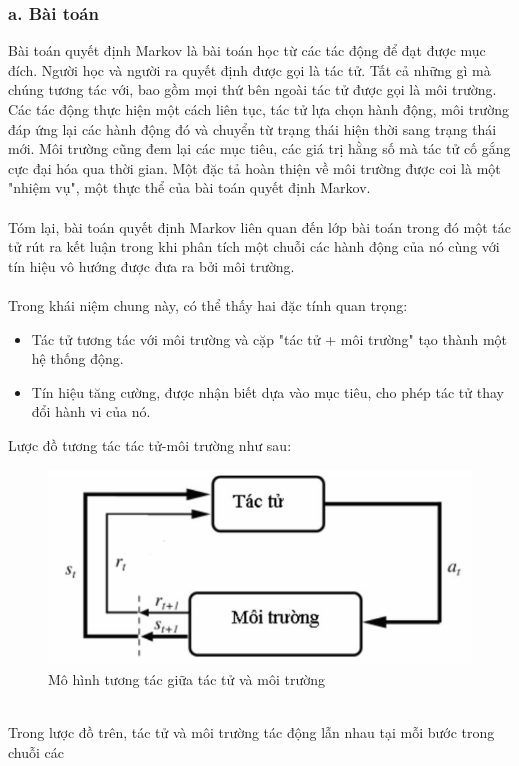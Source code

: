 \documentclass[12pt,a4paper]{report}
\begin{document}
\subsubsection{a. Bài toán}
Bài toán quyết định Markov là bài toán học từ các tác động để đạt được mục đích. Người
học và người ra quyết định được gọi là tác tử. Tất cả những gì mà chúng tương tác với, bao
gồm mọi thứ bên ngoài tác tử được gọi là môi trường. Các tác động thực hiện một cách liên
tục, tác tử lựa chọn hành động, môi trường đáp ứng lại các hành động đó và chuyển từ trạng
thái hiện thời sang trạng thái mới. Môi trường cũng đem lại các mục tiêu, các giá trị hằng số
mà tác tử cố gắng cực đại hóa qua thời gian. Một đặc tả hoàn thiện về môi trường được coi là
một "nhiệm vụ", một thực thể của bài toán quyết định Markov.\\\\
Tóm lại, bài toán quyết định Markov liên quan đến lớp bài toán trong đó một tác tử rút ra kết
luận trong khi phân tích một chuỗi các hành động của nó cùng với tín hiệu vô hướng được
đưa ra bởi môi trường.\\\\
Trong khái niệm chung này, có thể thấy hai đặc tính quan trọng:
\begin{itemize}
	\item Tác tử tương tác với môi trường và cặp "tác tử + môi trường" tạo thành một hệ thống
	động.
	\item Tín hiệu tăng cường, được nhận biết dựa vào mục tiêu, cho phép tác tử thay đổi hành
	vi của nó.
\end{itemize}
Lược đồ tương tác tác tử-môi trường như sau:
\begin{figure}[h]
	\centering
	\includegraphics[scale=.5]{2} 
	\caption{Mô hình tương tác giữa tác tử và môi trường}
\end{figure}\\
Trong lược đồ trên, tác tử và môi trường tác động lẫn nhau tại mỗi bước trong chuỗi các
\end{document}
